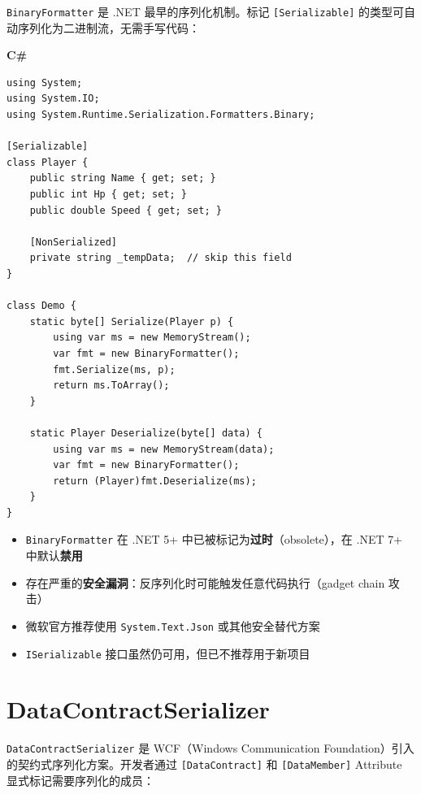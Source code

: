 \documentclass[12pt,a4paper,fontset=fandol]{ctexbook}
\newcommand{\Tp}[1]{\texttt{#1}}
\newcommand{\csharplabel}{%
  \noindent\begin{tcolorbox}[colback=csharpheadbg,coltext=white,
    sharp corners,boxrule=0pt,width=3.2em,height=1.4em,
    halign=center,valign=center,nobeforeafter,left=0pt,right=0pt,
    top=0pt,bottom=0pt]\small\bfseries C\#\end{tcolorbox}}
\begin{document}
\Tp{BinaryFormatter} 是 .NET 最早的序列化机制。标记 \texttt{[Serializable]} 的类型可自动序列化为二进制流，无需手写代码：

\csharplabel
\begin{lstlisting}[style=csharpstyle,caption={C\#: BinaryFormatter 自动序列化}]
using System;
using System.IO;
using System.Runtime.Serialization.Formatters.Binary;

[Serializable]
class Player {
    public string Name { get; set; }
    public int Hp { get; set; }
    public double Speed { get; set; }

    [NonSerialized]
    private string _tempData;  // skip this field
}

class Demo {
    static byte[] Serialize(Player p) {
        using var ms = new MemoryStream();
        var fmt = new BinaryFormatter();
        fmt.Serialize(ms, p);
        return ms.ToArray();
    }

    static Player Deserialize(byte[] data) {
        using var ms = new MemoryStream(data);
        var fmt = new BinaryFormatter();
        return (Player)fmt.Deserialize(ms);
    }
}
\end{lstlisting}

\begin{warning}[title={BinaryFormatter 已被废弃}]
\begin{itemize}[nosep]
  \item \Tp{BinaryFormatter} 在 .NET 5+ 中已被标记为\textbf{过时}（obsolete），在 .NET 7+ 中默认\textbf{禁用}
  \item 存在严重的\textbf{安全漏洞}：反序列化时可能触发任意代码执行（gadget chain 攻击）
  \item 微软官方推荐使用 \Tp{System.Text.Json} 或其他安全替代方案
  \item \Tp{ISerializable} 接口虽然仍可用，但已不推荐用于新项目
\end{itemize}
\end{warning}

\chapter{DataContractSerializer}\label{ch:datacontract}

\Tp{DataContractSerializer} 是 WCF（Windows Communication Foundation）引入的契约式序列化方案。开发者通过 \texttt{[DataContract]} 和 \texttt{[DataMember]} Attribute 显式标记需要序列化的成员：
\end{document}
